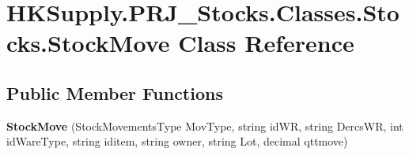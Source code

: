 \hypertarget{class_h_k_supply_1_1_p_r_j___stocks_1_1_classes_1_1_stocks_1_1_stock_move}{}\section{H\+K\+Supply.\+P\+R\+J\+\_\+\+Stocks.\+Classes.\+Stocks.\+Stock\+Move Class Reference}
\label{class_h_k_supply_1_1_p_r_j___stocks_1_1_classes_1_1_stocks_1_1_stock_move}
\subsection*{Public Member Functions}
\begin{DoxyCompactItemize}
\item 
\mbox{\label{class_h_k_supply_1_1_p_r_j___stocks_1_1_classes_1_1_stocks_1_1_stock_move_a01d128451f1aacdbb15239d38ee04c79}} 
{\bfseries Stock\+Move} (Stock\+Movements\+Type Mov\+Type, string id\+WR, string Dercs\+WR, int id\+Ware\+Type, string iditem, string owner, string Lot, decimal qttmove)
\end{DoxyCompactItemize}
